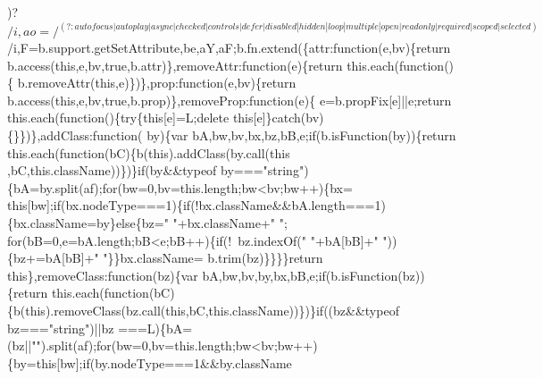 \begin{DoxyCode}
      )?$/i,ao=/^(?:autofocus|autoplay|async|checked|controls|defer|disabled|hidden|loop|multiple|open|readonly|
      required|scoped|selected)$/i,F=b.support.getSetAttribute,be,aY,aF;b.fn.extend(\{attr:\textcolor{keyword}{function}(e,bv)\{\textcolor{keywordflow}{return} 
      b.access(\textcolor{keyword}{this},e,bv,\textcolor{keyword}{true},b.attr)\},removeAttr:\textcolor{keyword}{function}(e)\{\textcolor{keywordflow}{return} this.each(\textcolor{keyword}{function}()\{
      b.removeAttr(\textcolor{keyword}{this},e)\})\},prop:\textcolor{keyword}{function}(e,bv)\{\textcolor{keywordflow}{return} b.access(\textcolor{keyword}{this},e,bv,\textcolor{keyword}{true},b.prop)\},removeProp:\textcolor{keyword}{function}(e)\{
      e=b.propFix[e]||e;\textcolor{keywordflow}{return} this.each(\textcolor{keyword}{function}()\{\textcolor{keywordflow}{try}\{\textcolor{keyword}{this}[e]=L;\textcolor{keyword}{delete} \textcolor{keyword}{this}[e]\}\textcolor{keywordflow}{catch}(bv)\{\}\})\},addClass:\textcolor{keyword}{function}(
      by)\{var bA,bw,bv,bx,bz,bB,e;\textcolor{keywordflow}{if}(b.isFunction(by))\{\textcolor{keywordflow}{return} this.each(\textcolor{keyword}{function}(bC)\{b(\textcolor{keyword}{this}).addClass(by.call(\textcolor{keyword}{this}
      ,bC,\textcolor{keyword}{this}.className))\})\}\textcolor{keywordflow}{if}(by&&typeof by===\textcolor{stringliteral}{"string"})\{bA=by.split(af);\textcolor{keywordflow}{for}(bw=0,bv=this.length;bw<bv;bw++)\{bx=\textcolor{keyword}{
      this}[bw];\textcolor{keywordflow}{if}(bx.nodeType===1)\{\textcolor{keywordflow}{if}(!bx.className&&bA.length===1)\{bx.className=by\}\textcolor{keywordflow}{else}\{bz=\textcolor{stringliteral}{" "}+bx.className+\textcolor{stringliteral}{" "};\textcolor{keywordflow}{
      for}(bB=0,e=bA.length;bB<e;bB++)\{\textcolor{keywordflow}{if}(!~bz.indexOf(\textcolor{stringliteral}{" "}+bA[bB]+\textcolor{stringliteral}{" "}))\{bz+=bA[bB]+\textcolor{stringliteral}{" "}\}\}bx.className=
      b.trim(bz)\}\}\}\}\textcolor{keywordflow}{return} \textcolor{keyword}{this}\},removeClass:\textcolor{keyword}{function}(bz)\{var bA,bw,bv,by,bx,bB,e;\textcolor{keywordflow}{if}(b.isFunction(bz))\{\textcolor{keywordflow}{return} 
      this.each(\textcolor{keyword}{function}(bC)\{b(\textcolor{keyword}{this}).removeClass(bz.call(\textcolor{keyword}{this},bC,\textcolor{keyword}{this}.className))\})\}\textcolor{keywordflow}{if}((bz&&typeof bz===\textcolor{stringliteral}{"string"})||bz
      ===L)\{bA=(bz||\textcolor{stringliteral}{""}).split(af);\textcolor{keywordflow}{for}(bw=0,bv=this.length;bw<bv;bw++)\{by=\textcolor{keyword}{this}[bw];\textcolor{keywordflow}{if}(by.nodeType===1&&by.className

\end{DoxyCode}
